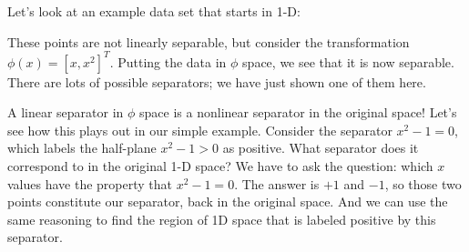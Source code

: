 Let's look at an example data set that starts in 1-D:

\begin{examplebox}
  \begin{center}
  \end{center}
\end{examplebox}

These points are not linearly separable,   but consider the
transformation $\phi(x) = [x,x^2]^T$. Putting the data in $\phi$ space,
we see that it is now separable.  There are lots of possible
separators;  we have just shown one of them here.

\begin{examplebox}
  \begin{center}
  \end{center}
\end{examplebox}

A linear separator in $\phi$ space is a nonlinear separator in the
original space!  Let's see how this plays out in our simple example.
Consider the separator $x^2  - 1 = 0$, which labels the half-plane
$x^2 -1 > 0$ as positive.  What separator does it correspond to in the
original 1-D space?
We have to ask the question:  which $x$ values have the property that
$x^2 - 1 = 0$.  The answer is $+1$ and $-1$, so those two points
constitute our separator, back in the original space.  And we can use
the same reasoning to find the region of 1D space that is labeled
positive by this separator.

